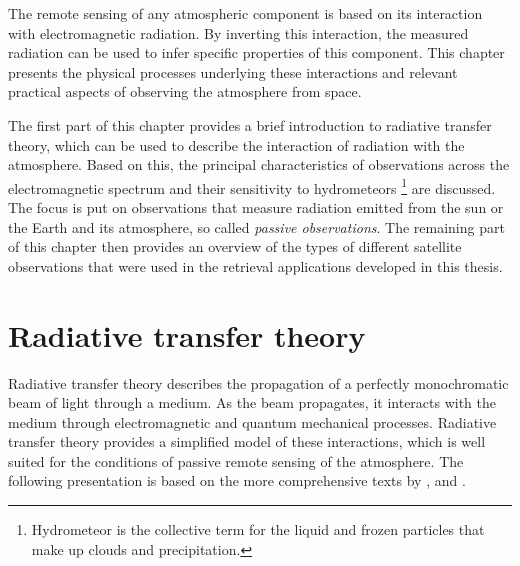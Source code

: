 
The remote sensing of any atmospheric component is based on its interaction with
electromagnetic radiation. By inverting this interaction, the measured radiation
can be used to infer specific properties of this component. This chapter presents
the physical processes underlying these interactions and  relevant
practical aspects of observing the atmosphere from space.

The first part of this chapter provides a brief introduction to radiative
transfer  theory, which can be used to describe the interaction of radiation
with the atmosphere. Based on this, the principal characteristics of
observations across the electromagnetic spectrum and their sensitivity to
hydrometeors%
%
\footnote{ Hydrometeor is the collective term for the liquid and frozen particles that make
up clouds and precipitation.}%
%
are discussed. The focus is put on observations that measure radiation emitted
from the sun or the Earth and its atmosphere, so called
\textit{passive observations}.
The remaining part of this chapter then provides an overview of the types of
different satellite observations that were used in the retrieval applications
developed in this thesis.




\section{Radiative transfer theory}

Radiative transfer theory describes the propagation of a perfectly monochromatic
beam of light through a medium. As the beam propagates, it interacts with the
medium through electromagnetic and quantum mechanical processes. Radiative
transfer theory provides a simplified model of these interactions, which is well
suited for the conditions of passive remote sensing of the atmosphere. The
following presentation is based on the more comprehensive texts
by \citet{mischenko02}, \citet{thomas02} and \citet{wallace06}.

